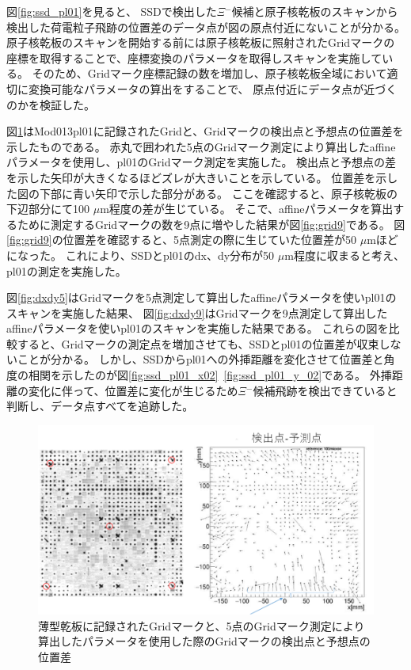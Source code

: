 \documentclass[12pt,a4paper]{jarticle}
\begin{document}
図\ref{fig:ssd_pl01}を見ると、
SSDで検出した$\Xi$$^-$候補と原子核乾板のスキャンから検出した荷電粒子飛跡の位置差のデータ点が図の原点付近にないことが分かる。
原子核乾板のスキャンを開始する前には原子核乾板に照射されたGridマークの座標を取得することで、座標変換のパラメータを取得しスキャンを実施している。
そのため、Gridマーク座標記録の数を増加し、原子核乾板全域において適切に変換可能なパラメータの算出をすることで、
原点付近にデータ点が近づくのかを検証した。
\newpage
\par
図\ref{fig:grid5}はMod013pl01に記録されたGridと、Gridマークの検出点と予想点の位置差を示したものである。
赤丸で囲われた5点のGridマーク測定により算出したaffineパラメータを使用し、pl01のGridマーク測定を実施した。
検出点と予想点の差を示した矢印が大きくなるほどズレが大きいことを示している。
位置差を示した図の下部に青い矢印で示した部分がある。
ここを確認すると、原子核乾板の下辺部分にて100 $\mu$m程度の差が生じている。
そこで、affineパラメータを算出するために測定するGridマークの数を9点に増やした結果が図\ref{fig:grid9}である。
図\ref{fig:grid9}の位置差を確認すると、5点測定の際に生じていた位置差が50 $\mu$mほどになった。
これにより、SSDとpl01のdx、dy分布が50 $\mu$m程度に収まると考え、pl01の測定を実施した。
\par
図\ref{fig:dxdy5}はGridマークを5点測定して算出したaffineパラメータを使いpl01のスキャンを実施した結果、
図\ref{fig:dxdy9}はGridマークを9点測定して算出したaffineパラメータを使いpl01のスキャンを実施した結果である。
これらの図を比較すると、Gridマークの測定点を増加させても、SSDとpl01の位置差が収束しないことが分かる。
しかし、SSDからpl01への外挿距離を変化させて位置差と角度の相関を示したのが図\ref{fig:ssd_pl01_x02}~\ref{fig:ssd_pl01_y_02}である。
外挿距離の変化に伴って、位置差に変化が生じるため$\Xi$$^-$候補飛跡を検出できていると判断し、データ点すべてを追跡した。
\begin{figure}[htbp]
  \centering
     \includegraphics[width=150mm]{grid5_pl01scan.png}
  \caption{薄型乾板に記録されたGridマークと、5点のGridマーク測定により算出したパラメータを使用した際のGridマークの検出点と予想点の位置差\label{fig:grid5}}
\end{figure}
\end{document}
